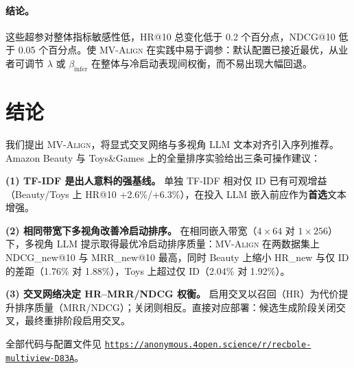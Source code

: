 \documentclass[sigconf,natbib=true,anonymous]{acmart}
\newcommand{\model}{\textsc{MV-Align}\xspace}
\newcommand{\tfidf}{\textsc{TF-IDF}\xspace}
\newcommand{\llm}{\textsc{LLM}\xspace}
\begin{document}
\paragraph{结论。}
这些超参对整体指标敏感性低，HR@10 总变化低于 0.2 个百分点，NDCG@10 低于 0.05 个百分点。使 \model 在实践中易于调参：默认配置已接近最优，从业者可调节 $\lambda$ 或 $\beta_{\text{infer}}$ 在整体与冷启动表现间权衡，而不易出现大幅回退。

\section{结论}
我们提出 \model，将显式交叉网络与多视角 \llm 文本对齐引入序列推荐。
Amazon Beauty 与 Toys\&Games 上的全量排序实验给出三条可操作建议：

\textbf{(1) TF-IDF 是出人意料的强基线。}
单独 \tfidf 相对仅 ID 已有可观增益（Beauty/Toys 上 HR@10 +2.6\%/+6.3\%），在投入 \llm 嵌入前应作为\textbf{首选}文本增强。

\textbf{(2) 相同带宽下多视角改善冷启动排序。}
在相同嵌入带宽（$4{\times}64$ 对 $1{\times}256$）下，多视角 \llm 提示取得最优冷启动排序质量：\model 在两数据集上 NDCG\_new@10 与 MRR\_new@10 最高，同时 Beauty 上缩小 HR\_new 与仅 ID 的差距（1.76\% 对 1.88\%），Toys 上超过仅 ID（2.04\% 对 1.92\%）。

\textbf{(3) 交叉网络决定 HR--MRR/NDCG 权衡。}
启用交叉以召回（HR）为代价提升排序质量（MRR/NDCG）；关闭则相反。直接对应部署：候选生成阶段关闭交叉，最终重排阶段启用交叉。

\smallskip\noindent
全部代码与配置文件见 \texttt{\url{https://anonymous.4open.science/r/recbole-multiview-D83A}}。




\end{document}
